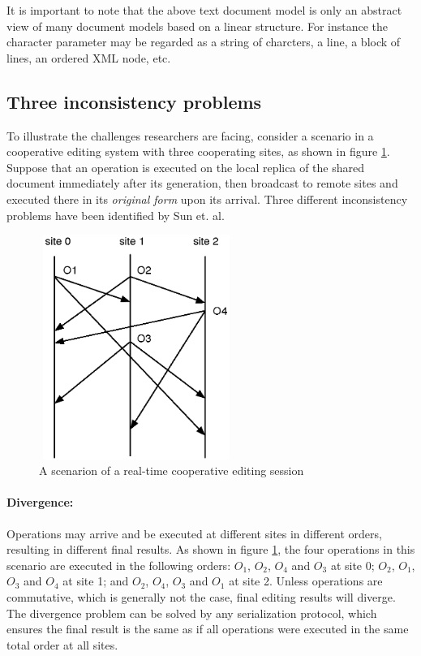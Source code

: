 \documentclass[11pt,a4paper]{article}
\begin{document}
It is important to note that the above text document model is only an abstract view of many document models based on a linear structure. For instance the character parameter may be regarded as a string of charcters, a line, a block of lines, an ordered XML node, etc.


\subsection{Three inconsistency problems}
\label{constraints}

To illustrate the challenges researchers are facing, consider a scenario in a cooperative editing system with three cooperating sites, as shown in figure \ref{fig:example1}. Suppose that an operation is executed on the local replica of the shared document immediately after its generation, then broadcast to remote sites and executed there in its \emph{original form} upon its arrival.
Three different inconsistency problems have been identified by {Sun et. al}\cite{sun98a}.

\begin{figure}
 \centering
 \includegraphics[width=2.5in,height=2.88in]{../../images/example1.eps}
 \caption{A scenarion of a real-time cooperative editing session}
 \label{fig:example1}
\end{figure}

\paragraph{Divergence:}
Operations may arrive and be executed at different sites in different orders, resulting in different final results. As shown in figure \ref{fig:example1}, the four operations in this scenario are executed in the following orders: $O_{1}$, $O_{2}$, $O_{4}$ and $O_{3}$ at site 0; $O_{2}$, $O_{1}$, $O_{3}$ and $O_{4}$ at site 1; and $O_{2}$, $O_{4}$, $O_{3}$ and $O_{1}$ at site 2. Unless operations are commutative, which is generally not the case, final editing results will diverge. The divergence problem can be solved by any serialization protocol, which ensures the final result is the same as if all operations were executed in the same total order at all sites.
\end{document}
